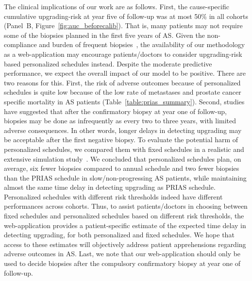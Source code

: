 The clinical implications of our work are as follows. First, the cause-specific cumulative upgrading-risk at year five of follow-up was at most 50\% in all cohorts (Panel~B, Figure~\ref{fig:auc_beforecalib}). That is, many patients may not require some of the biopsies planned in the first five years of AS. Given the non-compliance and burden of frequent biopsies~\citep{bokhorst2015compliance}, the availability of our methodology as a web-application may encourage patients/doctors to consider upgrading-risk based personalized schedules instead. Despite the moderate predictive performance, we expect the overall impact of our model to be positive. There are two reasons for this. First, the risk of adverse outcomes because of personalized schedules is quite low because of the low rate of metastases and prostate cancer specific mortality in AS patients (Table~\ref{table:prias_summary}). Second, studies~\citep{carvalho2017,inoue2018comparative} have suggested that after the confirmatory biopsy at year one of follow-up, biopsies may be done as infrequently as every two to three years, with limited adverse consequences. In other words, longer delays in detecting upgrading may be acceptable after the first negative biopsy. To evaluate the potential harm of personalized schedules, we compared them with fixed schedules in a realistic and extensive simulation study~\citep{tomer2019personalized}. We concluded that personalized schedules plan, on average, six fewer biopsies compared to annual schedule and two fewer biopsies than the PRIAS schedule in slow/non-progressing AS patients, while maintaining almost the same time delay in detecting upgrading as PRIAS schedule. Personalized schedules with different risk thresholds indeed have different performances across cohorts. Thus, to assist patients/doctors in choosing between fixed schedules and personalized schedules based on different risk thresholds, the web-application provides a patient-specific estimate of the expected time delay in detecting upgrading, for both personalized and fixed schedules. We hope that access to these estimates will objectively address patient apprehensions regarding adverse outcomes in AS. Last, we note that our web-application should only be used to decide biopsies after the compulsory confirmatory biopsy at year one of follow-up.

